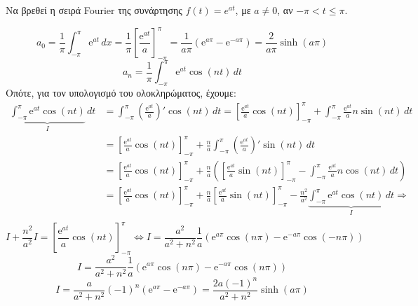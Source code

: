 \begin{mybox3}
  \begin{example}
    Να βρεθεί η σειρά Fourier της συνάρτησης $ f(t) = e^{at} $, με $ a \neq 0 $, αν 
    $ - \pi < t \leq \pi $.
  \end{example}
\end{mybox3}
\begin{solution}
  \[
    a_{0} = \frac{1}{\pi} \int _{- \pi }^{\pi} \mathrm{e}^{at} \,{dx} = 
    \frac{1}{\pi} \left[\frac{\mathrm{e}^{at}}{a} \right] _{- \pi }^{\pi} = 
    \frac{1}{a\pi} (\mathrm{e}^{a \pi} - \mathrm{e}^{-a \pi}) = \frac{2}{a \pi} 
    \sinh{(a \pi)} 
  \]
  \[
    a_{n} = \frac{1}{\pi} \int_{-\pi}^{\pi} \mathrm{e}^{at} \cos{(nt)} \,{dt}
  \]
  Οπότε, για τον υπολογισμό του ολοκληρώματος, έχουμε:
  \begin{align*}
    \underbrace{\int_{-\pi}^{\pi} \mathrm{e}^{at} \cos{(nt)}}_{I} \,{dt} 
    &= \int_{-\pi}^{\pi} \left(\frac{\mathrm{e}^{at}}{a} \right)' \cos{(nt)}\,{dt} 
    = \left[\frac{\mathrm{e}^{at}}{a} \cos{(nt)} 
    \right]_{- \pi }^{\pi} + \int_{-\pi}^{\pi} \frac{\mathrm{e}^{at}}{a} n \sin{(nt)}
    \,{dt} \\
    &= \left[\frac{\mathrm{e}^{at}}{a} \cos{(nt)} 
    \right]_{- \pi }^{\pi} + \frac{n}{a}  \int_{-\pi}^{\pi}
    \left(\frac{\mathrm{e}^{at}}{a}\right)' \sin{(nt)} \,{dt} \\
    &= \left[\frac{\mathrm{e}^{at}}{a} \cos{(nt)} 
    \right]_{- \pi }^{\pi} + \frac{n}{a} 
    \left(\left[\frac{\mathrm{e}^{at}}{a} \sin{(nt)} 
      \right]_{- \pi }^{\pi }-\int_{-\pi}^{\pi} \frac{\mathrm{e}^{at}}{a} n 
    \cos{(nt)} \,{dt}\right) \\ 
    &= \left[\frac{\mathrm{e}^{at}}{a} \cos{(nt)} 
    \right]_{- \pi }^{\pi} + \frac{n}{a} 
    \left[\frac{\mathrm{e}^{at}}{a} \sin{(nt)} 
    \right]_{- \pi }^{\pi }- \frac{n^{2}}{a^{2}}
    \underbrace{\int_{-\pi}^{\pi}
    \mathrm{e}^{at} \cos{(nt)} \,{dt}}_{I} \Rightarrow \\ 
  \end{align*}
  \[
    I+ \frac{n^{2}}{a^{2}} I =  \left[\frac{\mathrm{e}^{at}}{a} \cos{(nt)} 
    \right]_{- \pi }^{\pi} \Leftrightarrow 
    I = \frac{a^{2}}{a^{2}+n^{2}} \frac{1}{a}
    \left(\mathrm{e}^{a \pi} \cos{(n \pi)} - \mathrm{e}^{-a \pi} \cos{(-n \pi)}\right)
  \]
  \[
    I = \frac{a^{2}}{a^{2}+n^{2}} \frac{1}{a}
    \left(\mathrm{e}^{a \pi} \cos{(n \pi)} - \mathrm{e}^{-a \pi} \cos{(n \pi)}\right)
  \] 
  \[
    I = \frac{a}{a^{2}+n^{2}} (-1)^{n} \left(\mathrm{e}^{a \pi} - 
    \mathrm{e}^{-a \pi}\right) = \frac{2a(-1)^{n}}{a^{2}+n^{2}} \sinh{(a \pi)} 
\]
\end{solution}
